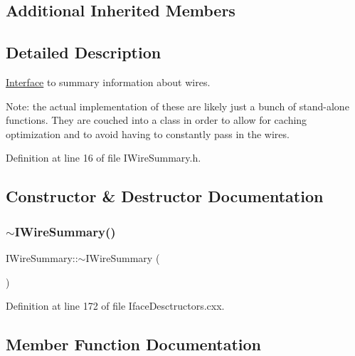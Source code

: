 \subsection*{Additional Inherited Members}


\subsection{Detailed Description}
\hyperlink{class_wire_cell_1_1_interface}{Interface} to summary information about wires.

Note\+: the actual implementation of these are likely just a bunch of stand-\/alone functions. They are couched into a class in order to allow for caching optimization and to avoid having to constantly pass in the wires. 

Definition at line 16 of file I\+Wire\+Summary.\+h.



\subsection{Constructor \& Destructor Documentation}
\mbox{\label{class_wire_cell_1_1_i_wire_summary_add8f74cd11ca13a3d91d8ae3bc9bfca4}} 
\subsubsection{\texorpdfstring{$\sim$\+I\+Wire\+Summary()}{~IWireSummary()}}
{\footnotesize\ttfamily I\+Wire\+Summary\+::$\sim$\+I\+Wire\+Summary (\begin{DoxyParamCaption}{ }\end{DoxyParamCaption})\hspace{0.3cm}{\ttfamily [virtual]}}



Definition at line 172 of file Iface\+Desctructors.\+cxx.



\subsection{Member Function Documentation}
\mbox{\label{class_wire_cell_1_1_i_wire_summary_a13c8567121a0ab3dc34f402eddd5f718}} 
